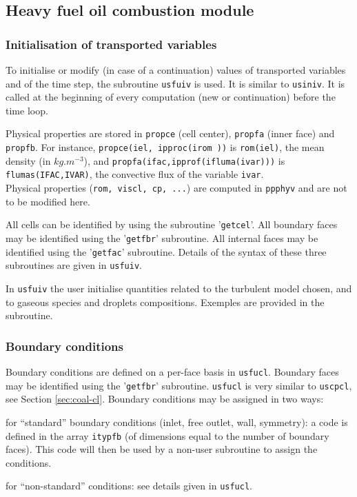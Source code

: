 {{{%
\subsection{Heavy fuel oil combustion module}
\subsubsection{Initialisation of transported variables}
To initialise or modify (in case of a continuation) values of transported variables and of the time step, the subroutine \texttt{usfuiv} is used. It is similar to \texttt{usiniv}. It is called at the beginning of every computation (new or continuation) before the time loop.

Physical properties are stored in \texttt{propce} (cell center), \texttt{propfa} (inner face) and \texttt{propfb}. For instance, \texttt{propce(iel, ipproc(irom  ))} is \texttt{rom(iel)}, the mean density (in $kg.m^{-3}$), and \texttt{propfa(ifac,ipprof(ifluma(ivar)))} is \texttt{flumas(IFAC,IVAR)}, the convective flux of the variable \texttt{ivar}.\\
Physical properties (\texttt{rom, viscl, cp, ...}) are computed in \texttt{ppphyv} and are not to be modified here.

All cells can be identified by using the subroutine '\texttt{getcel}'. All boundary faces may be identified using the '\texttt{getfbr}' subroutine. All internal faces may be identified using the '\texttt{getfac}' subroutine. Details of the syntax of these three subroutines are given in \texttt{usfuiv}.

In \texttt{usfuiv} the user initialise quantities related to the turbulent model chosen, and to gaseous species and droplets compositions. Exemples are provided in the subroutine.

\subsubsection{Boundary conditions}
Boundary conditions are defined on a per-face basis in \texttt{usfucl}. Boundary faces may be identified using the '\texttt{getfbr}' subroutine. \texttt{usfucl} is very similar to \texttt{uscpcl}, see Section \ref{sec:coal-cl}. Boundary conditions may be assigned in two ways:
\begin{list}{.}{}
\item for ``standard'' boundary conditions (inlet, free outlet, wall, symmetry): a code is defined in the array \texttt{itypfb} (of dimensions equal to the number of boundary faces). This code will then be used by a non-user subroutine to assign the conditions.
\item for ``non-standard'' conditions: see details given in \texttt{usfucl}.
\end{list}

}}}

